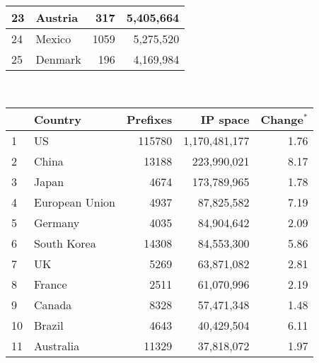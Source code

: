 \begin{table*}[p]
\begin{minipage}[t]{0.48\textwidth}
\begin{center}
\begin{tabular}{|l||l|r|r|}
23      &       Austria 		&       317     &       5,405,664       \tabularnewline \hline
24      &       Mexico  		&       1059    &       5,275,520       \tabularnewline \hline
25      &       Denmark 		&       196     &       4,169,984       \tabularnewline \hline
	\end{tabular}
	\end{center}
	\ \newline\ \newline
\end{minipage}
%
\quad
%
\begin{minipage}[t]{0.48\textwidth}
	\begin{center}
	\caption{Top 25 countries with the most number of announced IP space in BGP table on \textbf{April 23, 2009}}
	\label{tab:top25 bgp ip space 2009}
	\begin{tabular}{|l||l|r|r|r|}
		\hline
		&      \bf Country		& \bf Prefixes  &       \bf IP space 	& \bf Change$^{*}$ 	\tabularnewline \hline 
1       &       US      		&       115780  &       1,170,481,177   & 1.76			\tabularnewline \hline
2       &       China   		&       13188   &       223,990,021     & 8.17			\tabularnewline \hline
3       &       Japan   		&       4674    &       173,789,965     & 1.78			\tabularnewline \hline
4       &       European Union  &       4937    &       87,825,582      & 7.19			\tabularnewline \hline
5       &       Germany 		&       4035    &       84,904,642      & 2.09			\tabularnewline \hline
6       &       South Korea     &       14308   &       84,553,300      & 5.86			\tabularnewline \hline
7       &       UK      		&       5269    &       63,871,082      & 2.81			\tabularnewline \hline
8       &       France  		&       2511    &       61,070,996      & 2.19			\tabularnewline \hline
9       &       Canada  		&       8328    &       57,471,348      & 1.48			\tabularnewline \hline
10      &       Brazil  		&       4643    &       40,429,504      & 6.11			\tabularnewline \hline
11      &       Australia       &       11329   &       37,818,072      & 1.97			\tabularnewline \hline

\end{tabular}
\end{center}
\end{minipage}
\end{table*}
